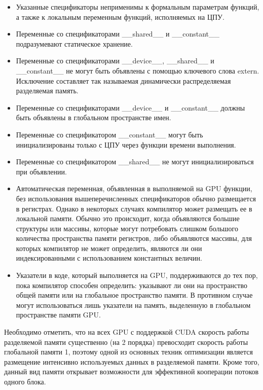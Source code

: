 \documentclass[a4paper, final]{article}
\begin{document}
\begin{itemize}
\item Указанные спецификаторы неприменимы к формальным параметрам 
функций, а также к локальным переменным функций, исполняемых на ЦПУ.

\item Переменные со спецификаторами \_\_shared\_\_ и \_\_constant\_\_ 
подразумевают статическое хранение. 

\item Переменные со спецификаторами \_\_device\_\_, \_\_shared\_\_ и \_\_constant\_\_ не могут быть объявлены с помощью ключевого слова extern. Исключение 
составляет так называемая динамически распределяемая разделяемая 
память.

\item Переменные со спецификаторами \_\_device\_\_ и \_\_constant\_\_ должны быть 
объявлены в глобальном пространстве имен. 

\item Переменные со спецификатором \_\_constant\_\_ могут быть 
инициализированы только с ЦПУ через функции времени выполнения. 
\item Переменные со спецификатором \_\_shared\_\_ не могут инициализироваться 
при объявлении.

\item Автоматическая переменная, объявленная в выполняемой на GPU 
функции, без использования вышеперечисленных спецификаторов обычно 
размещается в регистрах. Однако в некоторых случаях компилятор может 
размещать ее в локальной памяти. Обычно это происходит, когда 
объявляются большие структуры или массивы, которые могут потребовать 
слишком большого количества пространства памяти регистров, либо 
объявляются массивы, для которых компилятор не может определить, 
являются ли они индексированными с использованием константных 
величин.
 
\item Указатели в коде, который выполняется на GPU, поддерживаются до тех 
пор, пока компилятор способен определить: указывают ли они на 
пространство общей памяти или на глобальное пространство памяти. В 
противном случае могут использоваться лишь указатели на память, 
выделенную в глобальном пространстве памяти GPU. 
\end{itemize}

Необходимо отметить, что на всех GPU с поддержкой CUDA скорость работы разделяемой памяти существенно (на 2 порядка) превосходит скорость работы глобальной памяти 1, поэтому одной из основных техник 
оптимизации является размещение интенсивно используемых данных в 
разделяемой памяти. Кроме того, данный вид памяти открывает 
возможности для эффективной кооперации потоков одного блока. 
\end{document}
